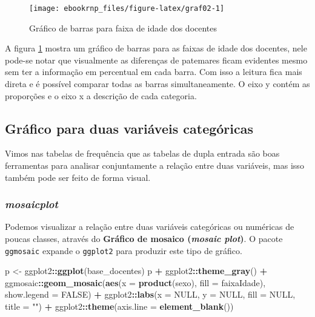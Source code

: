 \documentclass[12pt,]{style/krantz}
\makeatletter
\newenvironment{Shaded}{\begin{snugshade}}{\end{snugshade}}
\newcommand{\KeywordTok}[1]{\textcolor[rgb]{0.13,0.29,0.53}{\textbf{#1}}}
\newcommand{\DataTypeTok}[1]{\textcolor[rgb]{0.13,0.29,0.53}{#1}}
\newcommand{\StringTok}[1]{\textcolor[rgb]{0.31,0.60,0.02}{#1}}
\newcommand{\OtherTok}[1]{\textcolor[rgb]{0.56,0.35,0.01}{#1}}
\newcommand{\OperatorTok}[1]{\textcolor[rgb]{0.81,0.36,0.00}{\textbf{#1}}}
\newcommand{\NormalTok}[1]{#1}
\newenvironment{kframe}{%
\medskip{}
\setlength{\fboxsep}{.8em}
 \def\at@end@of@kframe{}%
 \ifinner\ifhmode%
  \def\at@end@of@kframe{\end{minipage}}%
  \begin{minipage}{\columnwidth}%
 \fi\fi%
 \def\FrameCommand##1{\hskip\@totalleftmargin \hskip-\fboxsep
 \colorbox{shadecolor}{##1}\hskip-\fboxsep
     \hskip-\linewidth \hskip-\@totalleftmargin \hskip\columnwidth}%
 \MakeFramed {\advance\hsize-\width
   \@totalleftmargin\z@ \linewidth\hsize
   \@setminipage}}%
 {\par\unskip\endMakeFramed%
 \at@end@of@kframe}
\renewenvironment{Shaded}{\begin{kframe}}{\end{kframe}}
\theoremstyle{definition}
\theoremstyle{definition}
\theoremstyle{definition}
\theoremstyle{remark}
\makeatother
\begin{document}
\begin{figure}[H]

{\centering \texttt{[image: ebookrnp\_files/figure-latex/graf02-1]} 

}

\caption{Gráfico de barras para faixa de idade dos docentes}\label{fig:graf02}
\end{figure}

A figura \ref{fig:graf02} mostra um gráfico de barras para as faixas de
idade dos docentes, nele pode-se notar que visualmente as diferenças de
patemares ficam evidentes mesmo sem ter a informação em percentual em
cada barra. Com isso a leitura fica mais direta e é possível comparar
todas as barras simultaneamente. O eixo y contém as proporções e o eixo
x a descrição de cada categoria.

\subsection{Gráfico para duas variáveis
categóricas}\label{grafico-para-duas-variaveis-categoricas}

Vimos nas tabelas de frequência que as tabelas de dupla entrada são boas
ferramentas para analisar conjuntamente a relação entre duas variáveis,
mas isso também pode ser feito de forma visual.

\subsubsection{\texorpdfstring{\emph{mosaicplot}}{mosaicplot}}\label{mosaicplot}

Podemos visualizar a relação entre duas variáveis categóricas ou
numéricas de poucas classes, através do \textbf{Gráfico de mosaico
(\emph{mosaic plot})}. O pacote \texttt{ggmosaic} expande o
\texttt{ggplot2} para produzir este tipo de gráfico.

\begin{Shaded}
\begin{Highlighting}[]
\NormalTok{p <-}\StringTok{ }\NormalTok{ggplot2}\OperatorTok{::}\KeywordTok{ggplot}\NormalTok{(base_docentes)}
\NormalTok{p }\OperatorTok{+}\StringTok{ }\NormalTok{ggplot2}\OperatorTok{::}\KeywordTok{theme_gray}\NormalTok{() }\OperatorTok{+}
\StringTok{  }\NormalTok{ggmosaic}\OperatorTok{::}\KeywordTok{geom_mosaic}\NormalTok{(}\KeywordTok{aes}\NormalTok{(}\DataTypeTok{x =} \KeywordTok{product}\NormalTok{(sexo), }\DataTypeTok{fill =}\NormalTok{ faixaIdade), }
                        \DataTypeTok{show.legend =} \OtherTok{FALSE}\NormalTok{) }\OperatorTok{+}
\StringTok{  }\NormalTok{ggplot2}\OperatorTok{::}\KeywordTok{labs}\NormalTok{(}\DataTypeTok{x =} \OtherTok{NULL}\NormalTok{, }\DataTypeTok{y =} \OtherTok{NULL}\NormalTok{, }\DataTypeTok{fill =} \OtherTok{NULL}\NormalTok{, }\DataTypeTok{title =} \StringTok{""}\NormalTok{) }\OperatorTok{+}
\StringTok{  }\NormalTok{ggplot2}\OperatorTok{::}\KeywordTok{theme}\NormalTok{(}\DataTypeTok{axis.line =} \KeywordTok{element_blank}\NormalTok{())}
\end{Highlighting}
\end{Shaded}
\end{document}
